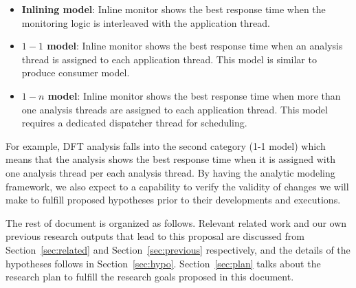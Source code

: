 \begin{itemize}

    \item {\bf Inlining model}: Inline monitor shows the best response time
            when the monitoring logic is interleaved with the application
            thread.

    \item {\bf $1-1$ model}: Inline monitor shows the best response time when an
            analysis thread is assigned to each application thread. This model
            is similar to produce consumer model.

    \item {\bf $1-n$ model}: Inline monitor shows the best response time when
            more than one analysis threads are assigned to each application
            thread.  This model requires a dedicated dispatcher thread for
            scheduling.
    \end{itemize}

For example, DFT analysis falls into the second category (1-1 model) which
means that the analysis shows the best response time when it is assigned with
one analysis thread per each analysis thread.  
%
By having the analytic modeling framework, we also expect to a capability to
verify the validity of changes we will make to fulfill proposed hypotheses
prior to their developments and executions. 

The rest of document is organized as follows. Relevant related work and our own
previous research outputs that lead to this proposal are discussed from
Section~\ref{sec:related} and Section~\ref{sec:previous} respectively, and the
details of the hypotheses follows in Section~\ref{sec:hypo}.
Section~\ref{sec:plan} talks about the research plan to fulfill the research
goals proposed in this document.

